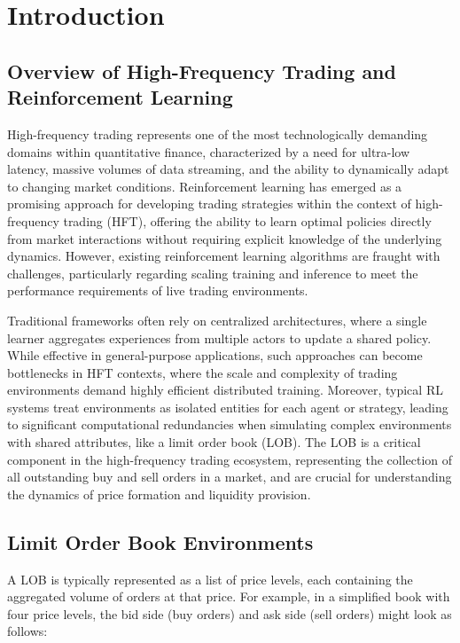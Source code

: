 \section{Introduction}
\label{sec:introduction}

\subsection{Overview of High-Frequency Trading and Reinforcement Learning}
High-frequency trading represents one of the most technologically demanding domains within quantitative finance,
characterized by a need for ultra-low latency, massive volumes of data streaming, and the ability to dynamically adapt to changing market conditions.
Reinforcement learning has emerged as a promising approach for developing trading strategies within the context of high-frequency trading (HFT),
offering the ability to learn optimal policies directly from market interactions without requiring explicit knowledge of the underlying dynamics.
However, existing reinforcement learning algorithms are fraught with challenges,
particularly regarding scaling training and inference to meet the performance requirements of live trading environments.

Traditional frameworks often rely on centralized architectures, where a single learner aggregates experiences from multiple actors to update a shared policy.
While effective in general-purpose applications, such approaches can become bottlenecks in HFT contexts,
where the scale and complexity of trading environments demand highly efficient distributed training.
Moreover, typical RL systems treat environments as isolated entities for each agent or strategy,
leading to significant computational redundancies when simulating complex environments with shared attributes, like a limit order book (LOB).
The LOB is a critical component in the high-frequency trading ecosystem, representing the collection of all outstanding buy and sell orders in a market,
and are crucial for understanding the dynamics of price formation and liquidity provision.

\subsection{Limit Order Book Environments}
A LOB is typically represented as a list of price levels, each containing the aggregated volume of orders at that price.
For example, in a simplified book with four price levels, the bid side (buy orders) and ask side (sell orders) might look as follows:

